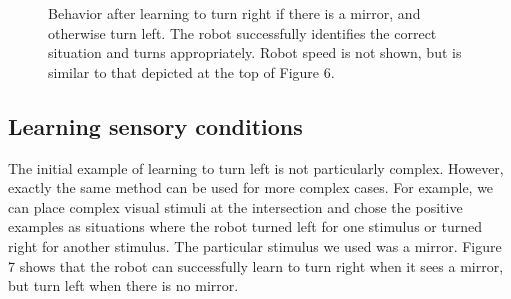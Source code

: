 \documentclass[conference]{IEEEtran}
\begin{document}
\begin{figure}[!t]
\label{Right}
\centering
\caption{Behavior after learning to turn right if there is a mirror, and otherwise turn left. The robot successfully identifies the correct situation and turns appropriately. Robot speed is not shown, but is similar to that depicted at the top of Figure 6.}
\end{figure}

\subsection{Learning sensory conditions}

The initial example of learning to turn left is not
particularly complex. However, exactly the same method
can be used for more complex cases. For example, we can
place complex visual stimuli at the intersection and chose
the positive examples as situations where the robot turned
left for one stimulus or turned right for another stimulus.
The particular stimulus we used was a mirror. Figure 7
shows that the robot can successfully learn to turn right
when it sees a mirror, but turn left when there is no mirror.
\end{document}
